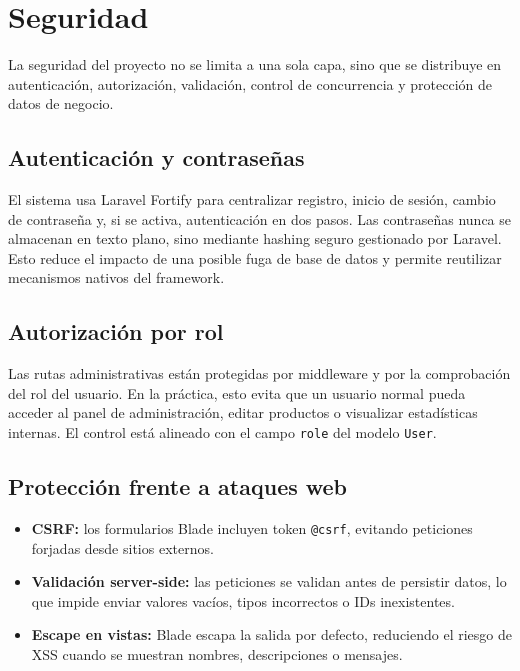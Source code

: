 \documentclass[12pt,a4paper]{report}
\begin{document}
\chapter{Seguridad}

La seguridad del proyecto no se limita a una sola capa, sino que se distribuye en autenticación, autorización, validación, control de concurrencia y protección de datos de negocio.

\section{Autenticación y contraseñas}

El sistema usa Laravel Fortify para centralizar registro, inicio de sesión, cambio de contraseña y, si se activa, autenticación en dos pasos. Las contraseñas nunca se almacenan en texto plano, sino mediante hashing seguro gestionado por Laravel. Esto reduce el impacto de una posible fuga de base de datos y permite reutilizar mecanismos nativos del framework.

\section{Autorización por rol}

Las rutas administrativas están protegidas por middleware y por la comprobación del rol del usuario. En la práctica, esto evita que un usuario normal pueda acceder al panel de administración, editar productos o visualizar estadísticas internas. El control está alineado con el campo \texttt{role} del modelo \texttt{User}.

\section{Protección frente a ataques web}

\begin{itemize}
  \item \textbf{CSRF:} los formularios Blade incluyen token \texttt{@csrf}, evitando peticiones forjadas desde sitios externos.
  \item \textbf{Validación server-side:} las peticiones se validan antes de persistir datos, lo que impide enviar valores vacíos, tipos incorrectos o IDs inexistentes.
  \item \textbf{Escape en vistas:} Blade escapa la salida por defecto, reduciendo el riesgo de XSS cuando se muestran nombres, descripciones o mensajes.
\end{itemize}
\end{document}
